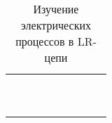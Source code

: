 \documentclass[a4paper,12pt]{article}
\begin{document}
\begin{table}
	\caption{Изучение электрических процессов в LR-цепи}
	\begin{tabularx}{\textwidth}{|X|X|X|X|X|X|X|X|X|}
		\hline 
		&  &  &  &  &  &  &  &  \\ 
		\hline 
		&  &  &  &  &  &  &  &  \\ 
		\hline 
		&  &  &  &  &  &  &  &  \\ 
		\hline 
		&  &  &  &  &  &  &  &  \\ 
		\hline 
		&  &  &  &  &  &  &  &  \\ 
		\hline 
		&  &  &  &  &  &  &  &  \\ 
		\hline 
		&  &  &  &  &  &  &  &  \\ 
		\hline 
		&  &  &  &  &  &  &  &  \\ 
		\hline 
		&  &  &  &  &  &  &  &  \\ 
		\hline 
		&  &  &  &  &  &  &  &  \\ 
		\hline 
		&  &  &  &  &  &  &  &  \\ 
		\hline 
	\end{tabularx} 
\end{table}
\end{document}
